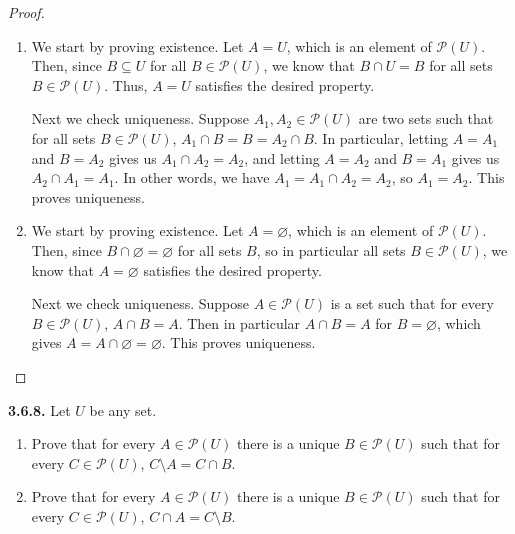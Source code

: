 \documentclass[12pt]{amsart}
\newenvironment{statement}[1]{\smallskip\noindent\color[rgb]{.6627, .3529, .6314} {\bf #1.}}{}
\theoremstyle{definition}
\theoremstyle{remark}
\newcommand{\powerset}[1]{\mathscr{P} \left( #1 \right)}
\begin{document}
\begin{proof}
\hfill
\begin{enumerate}
	\item We start by proving existence.
	Let $A = U$, which is an element of $\powerset{U}$.
	Then, since $B \subseteq U$ for all $B \in \powerset{U}$, we know that $B \cap U = B$ for all
	sets $B \in \powerset{U}$.
	Thus, $A = U$ satisfies the desired property.
	
	Next we check uniqueness.
	Suppose $A_1, A_2 \in \powerset{U}$ are two sets such that for all sets $B \in \powerset{U}$,
	$A_1 \cap B = B = A_2 \cap B$.
	In particular, letting $A = A_1$ and $B = A_2$ gives us $A_1 \cap A_2 = A_2$,
	and letting $A = A_2$ and $B = A_1$ gives us $A_2 \cap A_1 = A_1$.
	In other words, we have $A_1 = A_1 \cap A_2 = A_2$, so $A_1 = A_2$.
	This proves uniqueness.
	
	\item We start by proving existence.
	Let $A = \varnothing$, which is an element of $\powerset{U}$.
	Then, since $B \cap \varnothing = \varnothing$ for all sets $B$, 
	so in particular all sets $B \in \powerset{U}$, 
	we know that $A = \varnothing$ satisfies the desired property.
	
	Next we check uniqueness.
	Suppose $A \in \powerset{U}$ is a set such that for every $B \in \powerset{U}$, $A \cap B = A$.
	Then in particular $A \cap B = A$ for $B = \varnothing$, 
	which gives $A = A \cap \varnothing = \varnothing$.
	This proves uniqueness.
\end{enumerate}
\end{proof}


\begin{statement}{3.6.8}
Let $U$ be any set.
\begin{enumerate}
	\item Prove that for every $A \in \powerset{U}$ there is a unique $B \in \powerset{U}$ such that
	for every $C \in \powerset{U}$, $C \setminus A = C \cap B$.
	
	\item Prove that for every $A \in \powerset{U}$ there is a unique $B \in \powerset{U}$ such that
	for every $C \in \powerset{U}$, $C \cap A = C \setminus B$.
\end{enumerate}
\end{statement}
\end{document}
